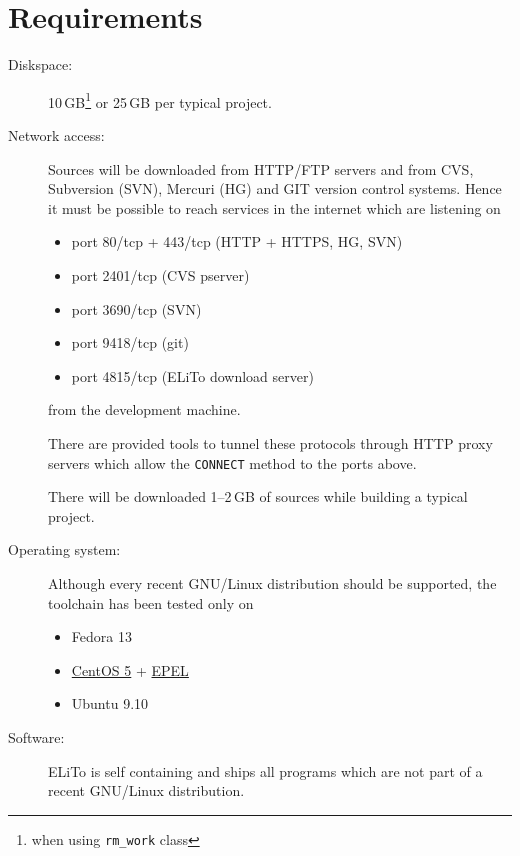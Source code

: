 
\chapter{Requirements}
\label{chap:reqs}

\begin{description}
\item[Diskspace:] 10\,GB\footnote{when using \texttt{rm\_work} class}
  or 25\,GB per typical project.
\item[Network access:] Sources will be downloaded from HTTP/FTP
  servers and from CVS, Subversion (SVN), Mercuri (HG) and GIT version
  control systems. Hence it must be possible to reach services in the
  internet which are listening on
  \begin{itemize}
  \item port 80/tcp + 443/tcp  (HTTP + HTTPS, HG, SVN)
  \item port 2401/tcp (CVS pserver)
  \item port 3690/tcp (SVN)
  \item port 9418/tcp (git)
  \item port 4815/tcp (ELiTo download server)
  \end{itemize}
  from the development machine.

  There are provided tools to tunnel these protocols through HTTP
  proxy servers which allow the \texttt{CONNECT} method to the ports
  above.

  There will be downloaded 1--2\,GB of sources while building a
  typical project.
\item[Operating system:] Although every recent GNU/Linux distribution
  should be supported, the toolchain has been tested only on
  \begin{itemize}
  \item Fedora 13
  \item \href{http://centos.org}{CentOS 5} + \href{https://fedoraproject.org/wiki/EPEL}{EPEL}
  \item Ubuntu 9.10
  \end{itemize}
\item[Software:] ELiTo is self containing and ships all programs which
  are not part of a recent GNU/Linux distribution.
\end{description}
